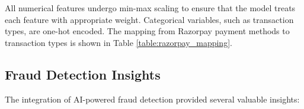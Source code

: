 \documentclass[onecolumn,a4paper,10pt]{IEEEtran}
\let\originalfloatbarrier\FloatBarrier
\renewcommand{\FloatBarrier}{\originalfloatbarrier}
\begin{document}
\FloatBarrier


All numerical features undergo min-max scaling to ensure that the model treats each feature with appropriate weight. Categorical variables, such as transaction types, are one-hot encoded. The mapping from Razorpay payment methods to transaction types is shown in Table \ref{table:razorpay_mapping}.


\FloatBarrier



\subsection{Fraud Detection Insights}
The integration of AI-powered fraud detection provided several valuable insights:
\end{document}
